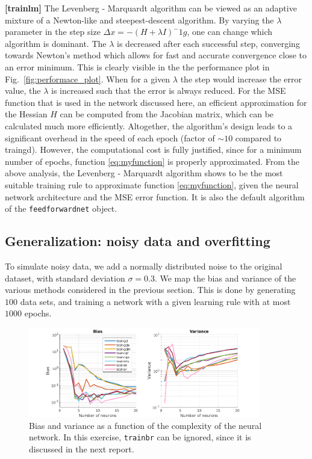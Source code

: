 \documentclass[pdftex,11pt,a4paper]{article}
\begin{document}
\textbf{[trainlm]} The Levenberg - Marquardt algorithm can be viewed as an adaptive mixture of a Newton-like and steepest-descent algorithm. By varying the $\lambda$ parameter in the step size $\Delta x = - (H + \lambda I)^-1 g$, one can change which algorithm is dominant. The $\lambda$ is decreased after each successful step, converging towards Newton's method which allows for fast and accurate convergence close to an error minimum. This is clearly visible in the the performance plot in Fig.~\ref{fig:performace_plot}. When for a given $\lambda$ the step would increase the error value, the $\lambda$ is increased such that the error is always reduced. For the MSE function that is used in the network discussed here, an efficient approximation for the Hessian $H$ can be computed from the Jacobian matrix, which can be calculated much more efficiently. Altogether, the algorithm's design leads to a significant overhead in the speed of each epoch (factor of $\sim 10$ compared to traingd). However, the computational cost is fully justified, since for a minimum number of epochs, function \eqref{eq:myfunction} is properly approximated.
From the above analysis, the Levenberg - Marquardt algorithm shows to be the most suitable training rule to approximate function \eqref{eq:myfunction}, given the neural network architecture and the MSE error function. It is also the default algorithm of the \texttt{feedforwardnet} object.

\subsection{Generalization: noisy data and overfitting}
To simulate noisy data, we add a normally distributed noise to the original dataset, with standard deviation $\sigma = 0.3$. We map the bias and variance of the various methods considered in the previous section. This is done by generating $100$ data sets, and training a network with a given learning rule with at most $1000$ epochs. 
\begin{figure}[hbt]
\centering
\includegraphics[width=0.9\textwidth]{figs/bias_and_variance.png}
\caption{Bias and variance as a function of the complexity of the neural network. In this exercise, \texttt{trainbr} can be ignored, since it is discussed in the next report.\label{fig:bias_and_variance}}
\end{figure}
\end{document}
